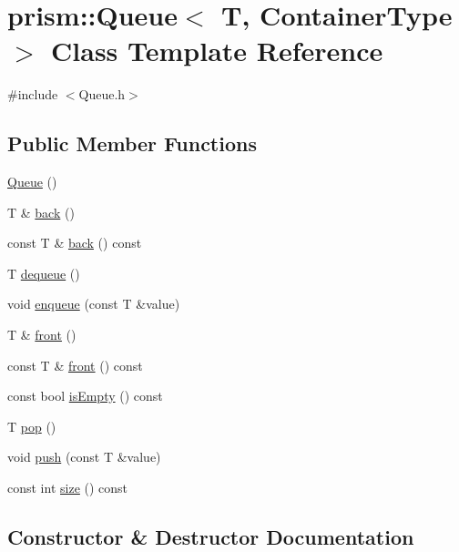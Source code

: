 \hypertarget{classprism_1_1_queue}{}\section{prism\+:\+:Queue$<$ T, Container\+Type $>$ Class Template Reference}
\label{classprism_1_1_queue}


{\ttfamily \#include $<$Queue.\+h$>$}

\subsection*{Public Member Functions}
\begin{DoxyCompactItemize}
\item 
\hyperlink{classprism_1_1_queue_a943cba3a4cde79f5fa364007f95f7f0a}{Queue} ()
\item 
T \& \hyperlink{classprism_1_1_queue_aec36e33bfdca9864e6d306858aae280d}{back} ()
\item 
const T \& \hyperlink{classprism_1_1_queue_affa363ef43576ea8cafe181044ffa608}{back} () const 
\item 
T \hyperlink{classprism_1_1_queue_a94b089c9e56c3dee7628c8c63ee9cc5f}{dequeue} ()
\item 
void \hyperlink{classprism_1_1_queue_a36e39d3d29bc77408b365d9652ce4b61}{enqueue} (const T \&value)
\item 
T \& \hyperlink{classprism_1_1_queue_a5dc211a8c79d1d089a678ebc7f2e43c4}{front} ()
\item 
const T \& \hyperlink{classprism_1_1_queue_a22bd93b06bacca633756a149ba27bb06}{front} () const 
\item 
const bool \hyperlink{classprism_1_1_queue_a0d747caa114058aceceb3bb789500ee4}{is\+Empty} () const 
\item 
T \hyperlink{classprism_1_1_queue_ac5a988d20ed06a55cb37d62d37e0ceda}{pop} ()
\item 
void \hyperlink{classprism_1_1_queue_af5cb19bac94390121914beb4ad147405}{push} (const T \&value)
\item 
const int \hyperlink{classprism_1_1_queue_a1c868feb72c566af4756593f2b5747d9}{size} () const 
\end{DoxyCompactItemize}


\subsection{Constructor \& Destructor Documentation}
